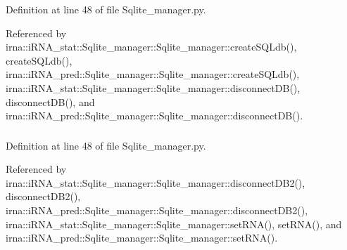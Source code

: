 \-Definition at line 48 of file \-Sqlite\-\_\-manager.\-py.



\-Referenced by irna\-::i\-R\-N\-A\-\_\-stat\-::\-Sqlite\-\_\-manager\-::\-Sqlite\-\_\-manager\-::create\-S\-Q\-Ldb(), create\-S\-Q\-Ldb(), irna\-::i\-R\-N\-A\-\_\-pred\-::\-Sqlite\-\_\-manager\-::\-Sqlite\-\_\-manager\-::create\-S\-Q\-Ldb(), irna\-::i\-R\-N\-A\-\_\-stat\-::\-Sqlite\-\_\-manager\-::\-Sqlite\-\_\-manager\-::disconnect\-D\-B(), disconnect\-D\-B(), and irna\-::i\-R\-N\-A\-\_\-pred\-::\-Sqlite\-\_\-manager\-::\-Sqlite\-\_\-manager\-::disconnect\-D\-B().

\hypertarget{classirna_1_1David2tulip_1_1Sqlite__manager_1_1Sqlite__manager_a65ec812a84daa123c5fd8bfb841b8c6d}{
\subsubsection[{cur}]{}}
\label{classirna_1_1David2tulip_1_1Sqlite__manager_1_1Sqlite__manager_a65ec812a84daa123c5fd8bfb841b8c6d}


\-Definition at line 48 of file \-Sqlite\-\_\-manager.\-py.



\-Referenced by irna\-::i\-R\-N\-A\-\_\-stat\-::\-Sqlite\-\_\-manager\-::\-Sqlite\-\_\-manager\-::disconnect\-D\-B2(), disconnect\-D\-B2(), irna\-::i\-R\-N\-A\-\_\-pred\-::\-Sqlite\-\_\-manager\-::\-Sqlite\-\_\-manager\-::disconnect\-D\-B2(), irna\-::i\-R\-N\-A\-\_\-stat\-::\-Sqlite\-\_\-manager\-::\-Sqlite\-\_\-manager\-::set\-R\-N\-A(), set\-R\-N\-A(), and irna\-::i\-R\-N\-A\-\_\-pred\-::\-Sqlite\-\_\-manager\-::\-Sqlite\-\_\-manager\-::set\-R\-N\-A().

\hypertarget{classirna_1_1David2tulip_1_1Sqlite__manager_1_1Sqlite__manager_a866f81627e0b8e462ed0f3eecde6e97f}{
\subsubsection[{db\-\_\-file}]{}}
\label{classirna_1_1David2tulip_1_1Sqlite__manager_1_1Sqlite__manager_a866f81627e0b8e462ed0f3eecde6e97f}


